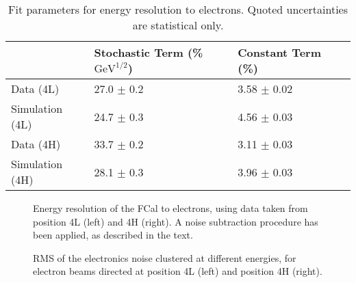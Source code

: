 \begin{table}[!htb]
\begin{center}
\begin{tabular}{|l|l|l|l|}
\hline
& Stochastic Term (\% $\mathrm{GeV}^{1/2}$) & Constant Term (\%) \\
\hline
Data (4L) & 27.0 $\pm$ 0.2 & 3.58 $\pm$ 0.02\\
Simulation (4L) & 24.7 $\pm$ 0.3 & 4.56 $\pm$ 0.03\\
Data (4H) & 33.7 $\pm$ 0.2 & 3.11 $\pm$ 0.03\\
Simulation (4H) & 28.1 $\pm$ 0.3 & 3.96 $\pm$ 0.03\\
\hline
\end{tabular}
\end{center}
\caption{Fit parameters for energy resolution to electrons. Quoted uncertainties are statistical only.}
\label{table_resolution_electrons}
\end{table}


\begin{figure}[htb]
\begin{center}
\caption{Energy resolution of the FCal to electrons, using data taken from position 4L (left) and 4H (right). A noise subtraction procedure has been applied, as described in the text.}
\label{TBplot_electron_resolution}
\end{center}
\end{figure}

\begin{figure}[htb]
\begin{centering}
\caption{RMS of the electronics noise clustered at different energies, for electron beams directed at position 4L (left) and position 4H (right).  } 
\label{TBplot_noisevbeam_electrons}
\end{centering}
\end{figure}

